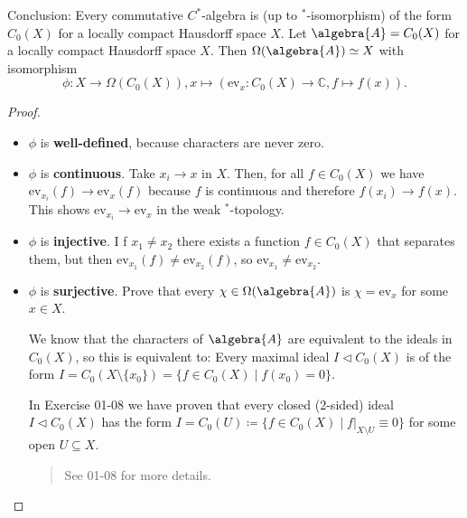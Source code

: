 \documentclass[a4paper]{article}
\begin{document}
\begin{proposition}
	Conclusion: Every commutative $C^*$-algebra is (up to $^*$-isomorphism) of the form $C_0(X)$ for a locally compact Hausdorff space $X$.
	Let $\algebra{A} = C_0(X)$ for a locally compact Hausdorff space $X$. Then $\Omega(\algebra{A}) \simeq X$ with isomorphism
	\begin{equation*}
		\phi: X \to \Omega(C_0(X)), x \mapsto (\mathrm{ev}_x: C_0(X) \to \mathds{C}, f \mapsto f(x))\text{.}
	\end{equation*}
\end{proposition}

\begin{proof}~
	\begin{itemize}
		\item $\phi$ is \textbf{well-defined}, because characters are never zero.
		\item $\phi$ is \textbf{continuous}.
		Take $x_i \to x$ in $X$.
		Then, for all $f \in C_0(X)$ we have $\mathrm{ev}_{x_i}(f) \to \mathrm{ev}_x(f)$ because $f$ is continuous and therefore $f(x_i) \to f(x)$.
		This shows $\mathrm{ev}_{x_i} \to \mathrm{ev}_x$ in the weak $^*$-topology.
		\item $\phi$ is \textbf{injective}. I
		f $x_1 \neq x_2$ there exists a function $f \in C_0(X)$ that separates them, but then $\mathrm{ev}_{x_1}(f) \neq \mathrm{ev}_{x_2}(f)$, so $\mathrm{ev}_{x_1} \neq \mathrm{ev}_{x_2}$.
		\item $\phi$ is \textbf{surjective}.  Prove that every $\chi \in \Omega(\algebra{A})$ is $\chi = \mathrm{ev}_x$ for some $x \in X$.
		
		We know that the characters of $\algebra{A}$ are equivalent to the ideals in $C_0(X)$, so this is equivalent to:
		Every maximal ideal $I \triangleleft C_0(X)$ is of the form $I = C_0(X \setminus \{x_0\}) = \{ f \in C_0(X) \mid f(x_0) = 0 \}$.

		In Exercise 01-08 we have proven that every closed (2-sided) ideal $I \triangleleft C_0(X)$ has the form $I = C_0(U) \coloneq \{ f \in C_0(X) \mid f|_{X \setminus U} \equiv 0 \}$ for some open $U \subseteq X$.

		\begin{quote}
			See 01-08 for more details.


\end{quote}
\end{itemize}
\end{proof}
\end{document}
